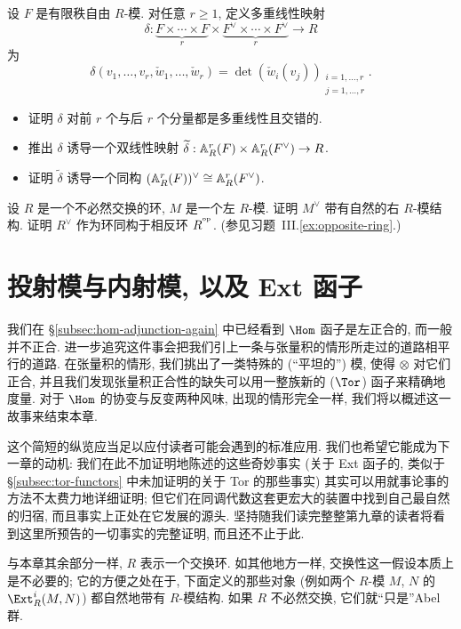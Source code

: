 \begin{prob}\label{ex:wedge-pairing}
设 $F$ 是有限秩自由 $R$-模. 对任意 $r\ge 1$, 定义多重线性映射
\[
\delta:\underbrace{F\times\cdots\times F}_{r}\times\underbrace{F^\vee\times\cdots\times F^\vee}_{r}\to R
\]
为
\[
\delta(v_1,\dots,v_r,\check{w}_1,\dots,\check{w}_r)=\det(\check{w}_i(v_j))_{\substack{i=1,\dots,r\\ j=1,\dots,r}}.
\]
\begin{itemize}
\item 证明 $\delta$ 对前 $r$ 个与后 $r$ 个分量都是多重线性且交错的.
\item 推出 $\delta$ 诱导一个双线性映射 $\widetilde{\delta}:\mathbb{A}_R^r(F)\times\mathbb{A}_R^r(F^\vee)\to R$.
\item 证明 $\widetilde{\delta}$ 诱导一个同构 $(\mathbb{A}_R^r(F))^\vee\cong\mathbb{A}_R^r(F^\vee)$.
\end{itemize}
\end{prob}

\begin{prob}\label{ex:dual-opposite-ring}
设 $R$ 是一个不必然交换的环, $M$ 是一个左 $R$-模. 证明 $M^\vee$ 带有自然的右 $R$-模结构. 证明 $R^\vee$ 作为环同构于相反环 $R^{^{\mathrm{op}}}$. (参见习题~III.\ref{ex:opposite-ring}.)
\end{prob}

\section{投射模与内射模, 以及 Ext 函子}\label{sec:projective-injective-ext}

我们在 \S\ref{subsec:hom-adjunction-again} 中已经看到 $\Hom$ 函子是左正合的, 而一般并不正合. 进一步追究这件事会把我们引上一条与张量积的情形所走过的道路相平行的道路. 在张量积的情形, 我们挑出了一类特殊的 (``平坦的'') 模, 使得 $\otimes$ 对它们正合, 并且我们发现张量积正合性的缺失可以用一整族新的 ($\Tor$) 函子来精确地度量. 对于 $\Hom$ 的协变与反变两种风味, 出现的情形完全一样, 我们将以概述这一故事来结束本章.

这个简短的纵览应当足以应付读者可能会遇到的标准应用. 我们也希望它能成为下一章的动机: 我们在此不加证明地陈述的这些奇妙事实 (关于 Ext 函子的, 类似于 \S\ref{subsec:tor-functors} 中未加证明的关于 Tor 的那些事实) 其实可以用就事论事的方法不太费力地详细证明; 但它们在同调代数这套更宏大的装置中找到自己最自然的归宿, 而且事实上正处在它发展的源头. 坚持随我们读完整整第九章的读者将看到这里所预告的一切事实的完整证明, 而且还不止于此.

与本章其余部分一样, $R$ 表示一个交换环. 如其他地方一样, 交换性这一假设本质上是不必要的; 它的方便之处在于, 下面定义的那些对象 (例如两个 $R$-模 $M$, $N$ 的 $\Ext_R^i(M,N)$) 都自然地带有 $R$-模结构. 如果 $R$ 不必然交换, 它们就``只是''Abel 群.

